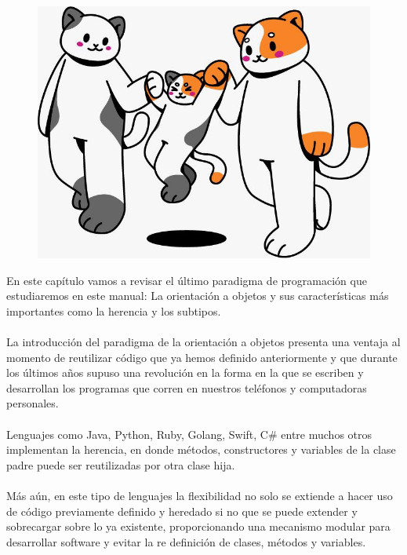 
\begin{figure}[htbp]
    \centerline{\includegraphics[scale=.5]{assets/10_gatitos_familia.jpg}}
\end{figure}

En este capítulo vamos a revisar el último paradigma de programación que estudiaremos en este manual: La orientación a objetos y sus características más importantes como la herencia y los subtipos.\\\\
La introducción del paradigma de la orientación a objetos presenta una ventaja al momento de reutilizar código que ya hemos definido anteriormente y que durante los últimos años supuso una revolución en la forma en la que se escriben y desarrollan los programas que corren en nuestros teléfonos y computadoras personales.\\\\
Lenguajes como \textsf{Java},  \textsf{Python}, \textsf{Ruby}, \textsf{Golang}, \textsf{Swift}, \textsf{C\#} entre muchos otros implementan la herencia, en donde métodos, constructores y variables de la clase padre puede ser reutilizadas por otra clase hija.\\\\
Más aún, en este tipo de lenguajes la flexibilidad no solo se extiende a hacer uso de código previamente definido y heredado si no que se puede extender y sobrecargar sobre lo ya existente, proporcionando una mecanismo modular para desarrollar software y evitar la re definición de clases, métodos y variables. 

